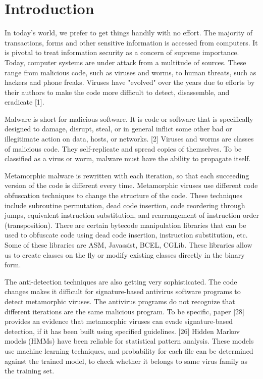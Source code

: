 \chapter{Introduction}

In today's world, we prefer to get things handily with no effort. The majority of transactions, forms and other sensitive information is accessed from computers. It is pivotal to treat information security as a concern of supreme importance. Today, computer systems are under attack from a multitude of sources. These range from malicious code, such as viruses and worms, to human threats, such as hackers and phone freaks.  Viruses have "evolved" over the years due to efforts by their authors to make the code more difficult to detect, disassemble, and eradicate [1].

Malware is short for malicious software. It is code or software that is specifically designed to damage, disrupt, steal, or in general inflict some other bad or illegitimate action on data, hosts, or networks. [2] Viruses and worms are classes of malicious code. They self-replicate and spread copies of themselves. To be classified as a virus or worm, malware must have the ability to propagate itself. 

Metamorphic malware is rewritten with each iteration, so that each succeeding version of the code is different every time. Metamorphic viruses use different code obfuscation techniques to change the structure of the code. These techniques include subroutine permutation, dead code insertion, code reordering through jumps, equivalent instruction substitution, and rearrangement of instruction order (transposition). There are certain bytecode manipulation libraries that can be used to obfuscate code using dead code insertion, instruction substitution, etc. Some of these libraries are ASM, Javassist, BCEL, CGLib. These libraries allow us to create classes on the fly or modify existing classes directly in the binary form.  

The anti-detection techniques are also getting very sophisticated. The code changes makes it difficult for signature-based antivirus software programs to detect metamorphic viruses. The antivirus programs do not recognize that different iterations are the same malicious program. To be specific, paper [28] provides an evidence that metamorphic viruses can evade signature-based detection, if it has been built using specified guidelines. [26] Hidden Markov models (HMMs) have been reliable for statistical pattern analysis. These models use machine learning techniques, and probability for each file can be determined against the trained model, to check whether it belongs to same virus family as the training set. 

